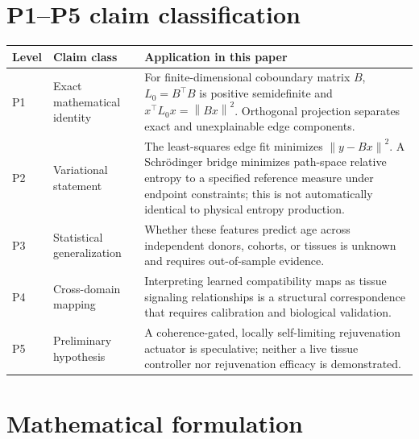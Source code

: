 \documentclass[11pt]{article}
\newcommand{\norm}[1]{\left\lVert #1\right\rVert}
\begin{document}
\section{\texorpdfstring{P1--P5 claim classification}{P1-P5 claim classification}}
\begin{longtable}{p{}p{}p{}}
\toprule
Level & Claim class & Application in this paper \\
\midrule
P1 & Exact mathematical identity & For finite-dimensional coboundary matrix $B$, $L_0=B^\top B$ is positive semidefinite and $x^\top L_0x=\norm{Bx}^2$. Orthogonal projection separates exact and unexplainable edge components. \\
P2 & Variational statement & The least-squares edge fit minimizes $\norm{y-Bx}^2$. A Schr\"odinger bridge minimizes path-space relative entropy to a specified reference measure under endpoint constraints; this is not automatically identical to physical entropy production. \\
P3 & Statistical generalization & Whether these features predict age across independent donors, cohorts, or tissues is unknown and requires out-of-sample evidence. \\
P4 & Cross-domain mapping & Interpreting learned compatibility maps as tissue signaling relationships is a structural correspondence that requires calibration and biological validation. \\
P5 & Preliminary hypothesis & A coherence-gated, locally self-limiting rejuvenation actuator is speculative; neither a live tissue controller nor rejuvenation efficacy is demonstrated. \\
\bottomrule
\end{longtable}

\section{Mathematical formulation}
\end{document}

